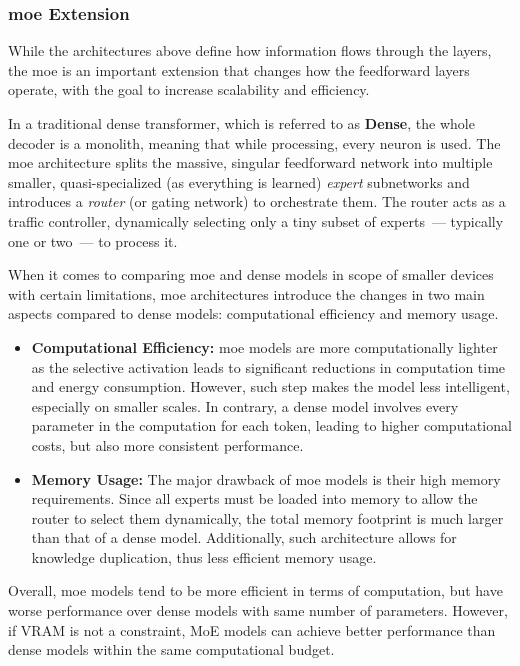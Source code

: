 \subsubsection{\gls{moe} Extension}

While the architectures above define how information flows through the layers,
the \gls{moe} is an important extension that changes how the feedforward layers
operate, with the goal to increase scalability and efficiency.

In a traditional dense transformer, which is referred to as \textbf{Dense}, the
whole decoder is a monolith, meaning that while processing, every neuron is
used. The \gls{moe} architecture splits the massive, singular feedforward
network into multiple smaller, quasi-specialized (as everything is learned)
\textsl{expert} subnetworks and introduces a \textsl{router} (or gating network)
to orchestrate them. The router acts as a traffic controller, dynamically
selecting only a tiny subset of experts~--- typically one or two~--- to process
it.

When it comes to comparing \gls{moe} and dense models in scope of smaller
devices with certain limitations, \gls{moe} architectures introduce the changes
in two main aspects compared to dense models: computational efficiency and
memory usage.
\begin{itemize}
  \item \textbf{Computational Efficiency:} \gls{moe} models are more
    computationally
    lighter as the selective activation leads to significant reductions in
    computation time and energy consumption. However, such step makes the
    model less intelligent, especially on smaller scales. In contrary, a
    dense model involves every parameter in the computation for each token,
    leading to higher computational costs, but also more consistent performance.
  \item \textbf{Memory Usage:} The major drawback of \gls{moe} models
    is their high
    memory requirements. Since all experts must be loaded into memory to allow
    the router to select them dynamically, the total memory footprint is
    much larger than that of a dense model. Additionally, such architecture
    allows for knowledge duplication, thus less efficient memory usage.
\end{itemize}
Overall, \gls{moe} models tend to be more efficient in terms of computation, but
have worse performance over dense models with same number of parameters.
However, if VRAM is not a constraint, MoE models can achieve better performance
than dense models within the same computational budget.

